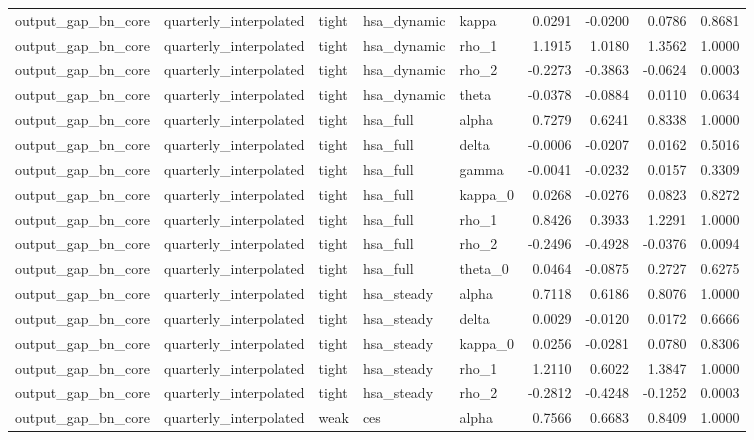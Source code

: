\begin{tabular}{lllllrrrr}
output\_gap\_bn\_core & quarterly\_interpolated & tight & hsa\_dynamic & kappa & 0.0291 & -0.0200 & 0.0786 & 0.8681 \\
output\_gap\_bn\_core & quarterly\_interpolated & tight & hsa\_dynamic & rho\_1 & 1.1915 & 1.0180 & 1.3562 & 1.0000 \\
output\_gap\_bn\_core & quarterly\_interpolated & tight & hsa\_dynamic & rho\_2 & -0.2273 & -0.3863 & -0.0624 & 0.0003 \\
output\_gap\_bn\_core & quarterly\_interpolated & tight & hsa\_dynamic & theta & -0.0378 & -0.0884 & 0.0110 & 0.0634 \\
output\_gap\_bn\_core & quarterly\_interpolated & tight & hsa\_full & alpha & 0.7279 & 0.6241 & 0.8338 & 1.0000 \\
output\_gap\_bn\_core & quarterly\_interpolated & tight & hsa\_full & delta & -0.0006 & -0.0207 & 0.0162 & 0.5016 \\
output\_gap\_bn\_core & quarterly\_interpolated & tight & hsa\_full & gamma & -0.0041 & -0.0232 & 0.0157 & 0.3309 \\
output\_gap\_bn\_core & quarterly\_interpolated & tight & hsa\_full & kappa\_0 & 0.0268 & -0.0276 & 0.0823 & 0.8272 \\
output\_gap\_bn\_core & quarterly\_interpolated & tight & hsa\_full & rho\_1 & 0.8426 & 0.3933 & 1.2291 & 1.0000 \\
output\_gap\_bn\_core & quarterly\_interpolated & tight & hsa\_full & rho\_2 & -0.2496 & -0.4928 & -0.0376 & 0.0094 \\
output\_gap\_bn\_core & quarterly\_interpolated & tight & hsa\_full & theta\_0 & 0.0464 & -0.0875 & 0.2727 & 0.6275 \\
output\_gap\_bn\_core & quarterly\_interpolated & tight & hsa\_steady & alpha & 0.7118 & 0.6186 & 0.8076 & 1.0000 \\
output\_gap\_bn\_core & quarterly\_interpolated & tight & hsa\_steady & delta & 0.0029 & -0.0120 & 0.0172 & 0.6666 \\
output\_gap\_bn\_core & quarterly\_interpolated & tight & hsa\_steady & kappa\_0 & 0.0256 & -0.0281 & 0.0780 & 0.8306 \\
output\_gap\_bn\_core & quarterly\_interpolated & tight & hsa\_steady & rho\_1 & 1.2110 & 0.6022 & 1.3847 & 1.0000 \\
output\_gap\_bn\_core & quarterly\_interpolated & tight & hsa\_steady & rho\_2 & -0.2812 & -0.4248 & -0.1252 & 0.0003 \\
output\_gap\_bn\_core & quarterly\_interpolated & weak & ces & alpha & 0.7566 & 0.6683 & 0.8409 & 1.0000 \\

\end{tabular}

